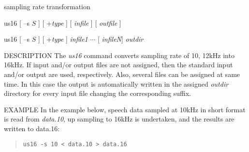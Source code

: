 %
{sampling rate transformation}

\begin{synopsis}
\item [us16] [ --s $S$ ] [ +{\em type} ] [ {\em infile} ] [ {\em outfile} ]
\item [us16] [ --s $S$ ] [ +{\em type} ] {\em infile1} $\cdots$ [ {\em infileN}] {\em outdir} 
\end{synopsis}

\begin{qsection}{DESCRIPTION}
The {\em us16} command converts sampling rate of 10, 12kHz
into 16kHz.
If input and/or output files are not assigned,
then the standard input and/or output are used, respectively.
Also, several files can be assigned at same time.
In this case the output is automatically written in the assigned
{\em outdir} directory for every input file
changing the corresponding suffix.
\par
\end{qsection}

\begin{options}
\end{options}

\begin{qsection}{EXAMPLE}
In the example below, speech data sampled at 10kHz in short format
is read from {\em data.10}, up sampling to 16kHz is undertaken,
and the results are written to {data.16}:
\begin{quote}
\verb!us16 -s 10 < data.10 > data.16!
\end{quote}
\end{qsection}


